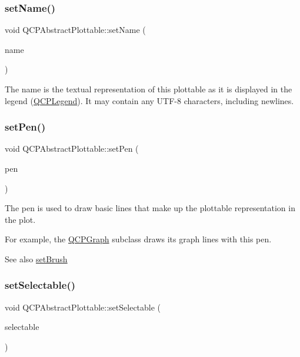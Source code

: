 \subsubsection{\texorpdfstring{setName()}{setName()}}
{\footnotesize\ttfamily void Q\+C\+P\+Abstract\+Plottable\+::set\+Name (\begin{DoxyParamCaption}\item[{const Q\+String \&}]{name }\end{DoxyParamCaption})}

The name is the textual representation of this plottable as it is displayed in the legend (\mbox{\hyperlink{class_q_c_p_legend}{Q\+C\+P\+Legend}}). It may contain any U\+T\+F-\/8 characters, including newlines. \mbox{\label{class_q_c_p_abstract_plottable_ab74b09ae4c0e7e13142fe4b5bf46cac7}} 
\subsubsection{\texorpdfstring{setPen()}{setPen()}}
{\footnotesize\ttfamily void Q\+C\+P\+Abstract\+Plottable\+::set\+Pen (\begin{DoxyParamCaption}\item[{const Q\+Pen \&}]{pen }\end{DoxyParamCaption})}

The pen is used to draw basic lines that make up the plottable representation in the plot.

For example, the \mbox{\hyperlink{class_q_c_p_graph}{Q\+C\+P\+Graph}} subclass draws its graph lines with this pen.

\begin{DoxySeeAlso}{See also}
\mbox{\hyperlink{class_q_c_p_abstract_plottable_a7a4b92144dca6453a1f0f210e27edc74}{set\+Brush}} 
\end{DoxySeeAlso}
\mbox{\label{class_q_c_p_abstract_plottable_ac238d6e910f976f1f30d41c2bca44ac3}} 
\subsubsection{\texorpdfstring{setSelectable()}{setSelectable()}}
{\footnotesize\ttfamily void Q\+C\+P\+Abstract\+Plottable\+::set\+Selectable (\begin{DoxyParamCaption}\item[{\mbox{\hyperlink{namespace_q_c_p_ac6cb9db26a564b27feda362a438db038}{Q\+C\+P\+::\+Selection\+Type}}}]{selectable }\end{DoxyParamCaption})}

